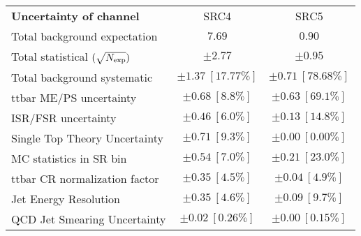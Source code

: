 
\begin{table}
\begin{center}
\setlength{\tabcolsep}{0.0pc}
\begin{tabular*}{\textwidth}{@{\extracolsep{\fill}}lcc}
\noalign{\smallskip}\hline\noalign{\smallskip}
{\bf Uncertainty of channel}                                    & SRC4            & SRC5            \\
\noalign{\smallskip}\hline\noalign{\smallskip}
Total background expectation             &  $7.69$        &  $0.90$       \\
\noalign{\smallskip}\hline\noalign{\smallskip}
Total statistical $(\sqrt{N_{\rm exp}})$              & $\pm 2.77$        & $\pm 0.95$       \\
Total background systematic               & $\pm 1.37\ [17.77\%] $        & $\pm 0.71\ [78.68\%] $             \\
\noalign{\smallskip}\hline\noalign{\smallskip}
\noalign{\smallskip}\hline\noalign{\smallskip}
ttbar ME/PS uncertainty        & $\pm 0.68\ [8.8\%] $          & $\pm 0.63\ [69.1\%] $       \\
ISR/FSR uncertainty        & $\pm 0.46\ [6.0\%] $          & $\pm 0.13\ [14.8\%] $       \\
Single Top Theory Uncertainty        & $\pm 0.71\ [9.3\%] $          & $\pm 0.00\ [0.00\%] $       \\
MC statistics in SR bin         & $\pm 0.54\ [7.0\%] $          & $\pm 0.21\ [23.0\%] $         \\
ttbar CR normalization factor         & $\pm 0.35\ [4.5\%] $          & $\pm 0.04\ [4.9\%] $       \\
Jet Energy Resolution        & $\pm 0.35\ [4.6\%] $          & $\pm 0.09\ [9.7\%] $       \\
QCD Jet Smearing Uncertainty        & $\pm 0.02\ [0.26\%] $          & $\pm 0.00\ [0.15\%] $       \\

\end{tabular*}
\end{center}
\end{table}

